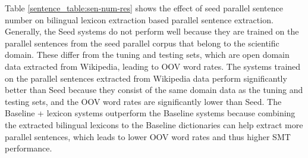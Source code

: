 \documentclass[english]{jnlp_1.4}
\begin{document}
\begin{table}[t]
\label{sentence_table:sen-num-res}

\end{table}

\begin{table}[t]
\label{sentence_table:training-sen-res}

\end{table}

Table \ref{sentence_table:sen-num-res} shows the effect of seed parallel sentence number on bilingual 
lexicon extraction based parallel sentence extraction. Generally, the Seed systems do not perform 
well because they are trained on the parallel sentences from the seed parallel corpus that belong to 
the scientific domain. These differ from the tuning and testing sets, which are open domain data 
extracted from Wikipedia, leading to OOV word rates. The systems trained on the parallel sentences 
extracted from Wikipedia data perform significantly better than Seed because they consist of the 
same domain data as the tuning and testing sets, and the OOV word rates are significantly lower 
than Seed. The Baseline + lexicon systems outperform the Baseline systems because combining the 
extracted bilingual lexicons to the Baseline dictionaries can help extract more parallel sentences, 
which leads to lower OOV word rates and thus higher SMT performance.
\end{document}
